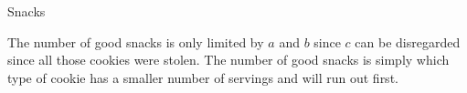 \begin{tutorial}{Snacks}

The number of good snacks is only limited by $a$ and $b$ since $c$ can be disregarded since all those cookies were stolen. The number of good snacks is simply which type of cookie has a smaller number of servings and will run out first.

\end{tutorial}
